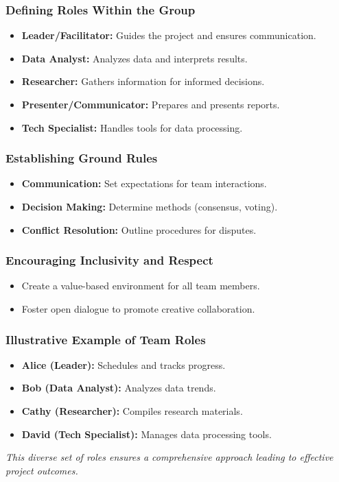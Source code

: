 \documentclass[aspectratio=169]{beamer}
\begin{document}
\begin{frame}[fragile]
    \frametitle{Defining Roles Within the Group}
    \begin{itemize}
        \item \textbf{Leader/Facilitator:} Guides the project and ensures communication.
        \item \textbf{Data Analyst:} Analyzes data and interprets results.
        \item \textbf{Researcher:} Gathers information for informed decisions.
        \item \textbf{Presenter/Communicator:} Prepares and presents reports.
        \item \textbf{Tech Specialist:} Handles tools for data processing.
    \end{itemize}
\end{frame}

\begin{frame}[fragile]
    \frametitle{Establishing Ground Rules}
    \begin{itemize}
        \item \textbf{Communication:} Set expectations for team interactions.
        \item \textbf{Decision Making:} Determine methods (consensus, voting).
        \item \textbf{Conflict Resolution:} Outline procedures for disputes.
    \end{itemize}
\end{frame}

\begin{frame}[fragile]
    \frametitle{Encouraging Inclusivity and Respect}
    \begin{itemize}
        \item Create a value-based environment for all team members.
        \item Foster open dialogue to promote creative collaboration.
    \end{itemize}
\end{frame}

\begin{frame}[fragile]
    \frametitle{Illustrative Example of Team Roles}
    \begin{itemize}
        \item \textbf{Alice (Leader):} Schedules and tracks progress.
        \item \textbf{Bob (Data Analyst):} Analyzes data trends.
        \item \textbf{Cathy (Researcher):} Compiles research materials.
        \item \textbf{David (Tech Specialist):} Manages data processing tools.
    \end{itemize}
    \textit{This diverse set of roles ensures a comprehensive approach leading to effective project outcomes.}
\end{frame}
\end{document}
